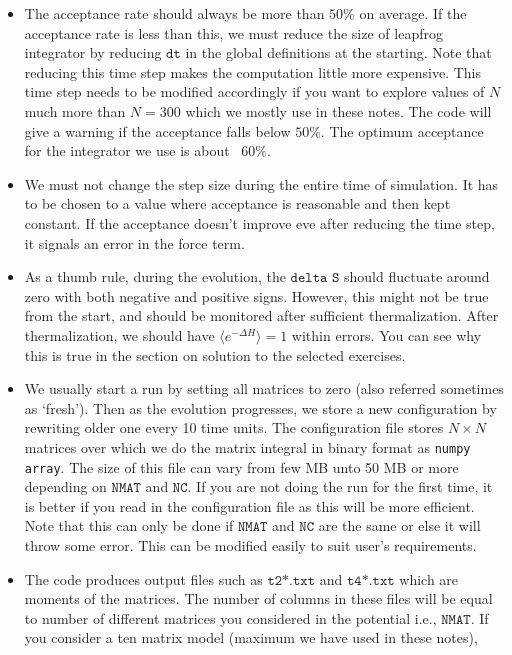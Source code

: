 \documentclass[11pt]{article}
\begin{document}
\begin{itemize} 
\item The acceptance rate should always be more than $50\%$
on average. If the acceptance rate is less than this, we
must reduce the size of leapfrog integrator by reducing 
$\texttt{dt}$ in the global definitions at the starting. Note that 
reducing this time step makes the computation little more expensive. 
This time step needs to be modified accordingly if you want to explore values of $N$
much more than $N = 300$ which we mostly use in these notes. The code will give a warning
if the acceptance falls below $50\%$. The optimum acceptance for the integrator we use is 
about ~$60\%$. 
\item We must not change the step size during the entire time of simulation. It has to be 
chosen to a value where acceptance is reasonable and then kept constant. If the acceptance
doesn't improve eve after reducing the time step, it signals an error in the force term.
\item As a thumb rule, during the evolution, the $\texttt{delta S}$ should fluctuate around zero
with both negative and positive signs. However, this might not be true from the start, and should
be monitored after sufficient thermalization. After thermalization, we should have 
$\langle e^{-\Delta H} \rangle = 1$ within errors. You can see why this is true in the section on 
solution to the selected exercises. 
\item We usually start a run by setting all matrices to zero (also referred sometimes as `fresh'). 
Then as the evolution progresses, we store a new configuration by rewriting older one
every 10 time units. The configuration file stores $N \times N$
matrices over which we do the matrix integral in binary format as \texttt{numpy array}. 
The size of this file can vary from few MB unto 50 MB or more depending on 
$\texttt{NMAT}$ and $\texttt{NC}$. If you are not doing the run for the first time, 
it is better if you read in the configuration file as this will be more efficient.  
Note that this can only be done if $\texttt{NMAT}$ and $\texttt{NC}$ are the same or else
it will throw some error. This can be modified easily to suit user's requirements. 
\item The code produces output files such as $\texttt{t2*.txt}$ and $\texttt{t4*.txt}$
which are moments of the matrices. The number of columns in these files will be equal to 
number of different matrices you considered in the potential i.e., $\texttt{NMAT}$. 
If you consider a ten matrix model (maximum we have used in these notes),

\end{itemize}
\end{document}
